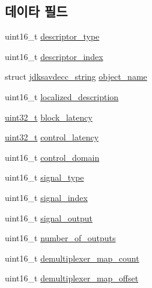 \subsection*{데이타 필드}
\begin{DoxyCompactItemize}
\item 
uint16\+\_\+t \hyperlink{structjdksavdecc__descriptor__signal__demultiplexer_ab7c32b6c7131c13d4ea3b7ee2f09b78d}{descriptor\+\_\+type}
\item 
uint16\+\_\+t \hyperlink{structjdksavdecc__descriptor__signal__demultiplexer_a042bbc76d835b82d27c1932431ee38d4}{descriptor\+\_\+index}
\item 
struct \hyperlink{structjdksavdecc__string}{jdksavdecc\+\_\+string} \hyperlink{structjdksavdecc__descriptor__signal__demultiplexer_a7d1f5945a13863b1762fc6db74fa8f80}{object\+\_\+name}
\item 
uint16\+\_\+t \hyperlink{structjdksavdecc__descriptor__signal__demultiplexer_a0926f846ca65a83ad5bb06b4aff8f408}{localized\+\_\+description}
\item 
\hyperlink{parse_8c_a6eb1e68cc391dd753bc8ce896dbb8315}{uint32\+\_\+t} \hyperlink{structjdksavdecc__descriptor__signal__demultiplexer_ae2e9f0088d5e900b610d1b2818dfc559}{block\+\_\+latency}
\item 
\hyperlink{parse_8c_a6eb1e68cc391dd753bc8ce896dbb8315}{uint32\+\_\+t} \hyperlink{structjdksavdecc__descriptor__signal__demultiplexer_ab2bd4639caaf9a8078b68368afbd63b6}{control\+\_\+latency}
\item 
uint16\+\_\+t \hyperlink{structjdksavdecc__descriptor__signal__demultiplexer_a8937b22996b7c28ae209f29fe777f03a}{control\+\_\+domain}
\item 
uint16\+\_\+t \hyperlink{structjdksavdecc__descriptor__signal__demultiplexer_a248e60ef99d5ed1779989d1dd6b6dc5a}{signal\+\_\+type}
\item 
uint16\+\_\+t \hyperlink{structjdksavdecc__descriptor__signal__demultiplexer_ae2e81a95ee9ad83f1fe22b6a1ee29075}{signal\+\_\+index}
\item 
uint16\+\_\+t \hyperlink{structjdksavdecc__descriptor__signal__demultiplexer_ab4b91864e6fc335d7e86536d9f4461e4}{signal\+\_\+output}
\item 
uint16\+\_\+t \hyperlink{structjdksavdecc__descriptor__signal__demultiplexer_acce19609ff3454a0c9b0213591331fa7}{number\+\_\+of\+\_\+outputs}
\item 
uint16\+\_\+t \hyperlink{structjdksavdecc__descriptor__signal__demultiplexer_a5afb8e79e6e5c0ed3dd238c64db880cc}{demultiplexer\+\_\+map\+\_\+count}
\item 
uint16\+\_\+t \hyperlink{structjdksavdecc__descriptor__signal__demultiplexer_a83202341fb27aff9f040befa95f63a08}{demultiplexer\+\_\+map\+\_\+offset}
\end{DoxyCompactItemize}


